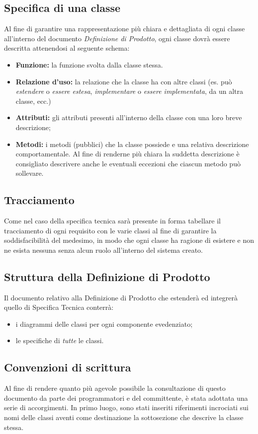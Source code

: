 {\subsection{Specifica di una classe}
Al fine di garantire una rappresentazione più chiara e dettagliata di ogni classe all'interno del documento \textit{Definizione di Prodotto}, ogni classe dovrà essere descritta attenendosi al seguente schema:

\begin{itemize} 
\item \textbf{Funzione:} la funzione svolta dalla classe stessa.
\item \textbf{Relazione d'uso:} la relazione che la classe ha con altre classi (es. può \textit{estendere} o \textit{essere estesa}, \textit{implementare} o \textit{essere implementata}, da un altra classe, ecc.)
\item \textbf{Attributi:} gli attributi presenti all'interno della classe con una loro breve descrizione;
\item \textbf{Metodi:} i metodi (pubblici) che la classe possiede e una relativa descrizione comportamentale. Al fine di renderne più chiara la suddetta descrizione è consigliato descrivere anche le eventuali eccezioni che ciascun metodo può sollevare.
\end{itemize}

\subsection{Tracciamento}
Come nel caso della specifica tecnica sarà presente in forma tabellare il tracciamento di ogni requisito con le varie classi al fine di garantire la soddisfacibilità del medesimo, in modo che ogni classe ha ragione di esistere e non ne esista nessuna senza alcun ruolo all'interno del sistema creato.

\subsection{Struttura della Definizione di Prodotto}
Il documento relativo alla Definizione di Prodotto che estenderà ed integrerà quello di Specifica Tecnica conterrà:
\begin{itemize}
\item i diagrammi delle classi per ogni componente evedenziato;
\item le specifiche di \textit{tutte} le classi.
\end{itemize}

\subsection{Convenzioni di scrittura}
Al fine di rendere quanto più agevole possibile la consultazione di questo documento da parte dei programmatori e del committente, è stata adottata una serie di accorgimenti. In primo luogo, sono stati inseriti riferimenti incrociati sui nomi delle classi aventi come destinazione la sottosezione che descrive la classe stessa.

}
